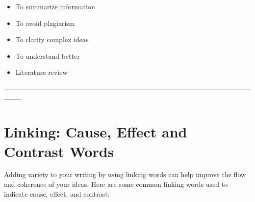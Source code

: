 \begin{itemize}
    \item To summarize information
    \item To avoid plagiarism
    \item To clarify complex ideas
    \item To understand better
    \item Literature review
\end{itemize}



--------------------------------------------------------------------------------------------------------------------

\section{Linking: Cause, Effect and Contrast Words}

Adding variety to your writing by using linking words can help improve the flow and coherence of your ideas. Here are some common linking words used to indicate cause, effect, and contrast:


